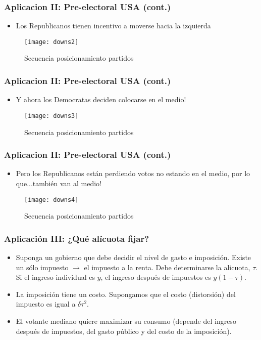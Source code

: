 \documentclass[14pt,aspectratio=169]{beamer}
\begin{document}
\begin{frame}\frametitle{Aplicacion II: Pre-electoral USA (cont.)}
\begin{itemize}
\item Los Republicanos tienen incentivo a moverse hacia la izquierda
 \end{itemize}
\begin{figure}[htbp] \vspace{-1cm}
  \centering
  \texttt{[image: downs2]} \vspace{-1cm}
  \caption{Secuencia posicionamiento partidos}
  \label{fig:3}
\end{figure}
\end{frame}


\begin{frame}\frametitle{Aplicacion II: Pre-electoral USA (cont.)}
\begin{itemize}
\item Y ahora los Democratas deciden colocarse en el medio!
 \end{itemize}
\begin{figure}[htbp] \vspace{-1cm}
  \centering
  \texttt{[image: downs3]} \vspace{-1cm}
  \caption{Secuencia posicionamiento partidos}
  \label{fig:3}
\end{figure}
\end{frame}


\begin{frame}\frametitle{Aplicacion II: Pre-electoral USA (cont.)}
\begin{itemize}
\item Pero los Republicanos están perdiendo votos no estando en el
  medio, por lo que...también van al medio! 
 \end{itemize}
\begin{figure}[htbp] \vspace{-1cm}
  \centering
  \texttt{[image: downs4]} \vspace{-1cm}
  \caption{Secuencia posicionamiento partidos}
  \label{fig:3}
\end{figure}
\end{frame}


\begin{frame}\frametitle{Aplicación III: ¿Qué alícuota fijar?}
\begin{itemize}
\item Suponga un gobierno que debe decidir el nivel de gasto e
  imposición. Existe un sólo impuesto $\longrightarrow$ el impuesto a
  la renta. Debe determinarse la alicuota, $\tau$. Si el ingreso
  individual es $y$, el ingreso después de impuestos es $y(1-\tau)$.
\item La imposición tiene un costo. Supongamos que el costo
  (distorsión) del impuesto es igual a $\delta \tau^2$. 
\item El votante mediano quiere maximizar su consumo (depende del
  ingreso después de impuestos, del gasto público y del costo de la
  imposición).
\end{itemize}
\end{frame}
\end{document}
